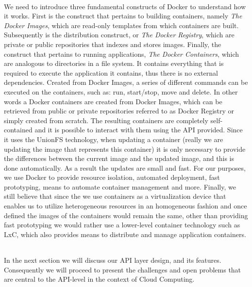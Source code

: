 \documentclass[11pt]{amsart}
\begin{document}
\begin{enumarate}
          \\ We need to introduce three fundamental constructs of Docker to understand how
          it works. First is the construct that pertains to building containers, namely
          \emph{The Docker Images}, which are read-only templates from which containers
          are built. Subsequently is the distribution construct, or \emph{The Docker
            Registry}, which are private or public repositories that indexes and stores
          images. Finally, the construct that pertains to running applications, \emph{The
            Docker Containers}, which are analogous to directories in a file system. It
          contains everything that is required to execute the application it contains,
          thus there is no external dependencies. Created from Docker Images, a series of
          different commands can be executed on the containers, such as: run, start/stop,
          move and delete. In other words a Docker containers are created from Docker
          Images, which can be retrieved from public or private repositories referred to
          as Docker Registry or simply created from scratch. The resulting containers are
          completely self-contained and it is possible to interact with them using the API
          provided. Since it uses the UnionFS technology, when updating a container
          (really we are updating the image that represents this container) it is only
          necessary to provide the differences between the current image and the updated
          image, and this is done automatically. As a result the updates are small and
          fast. For our purposes, we use Docker to provide resource isolation, automated
          deployment, fast prototyping, means to automate container management and
          more. Finally, we still believe that since the we use containers as a
          virtualization device that enables us to utilize heterogeneous resources in an
          homogeneous fashion and once defined the images of the containers would remain
          the same, other than providing fast prototyping we would rather use a
          lower-level container technology such as LxC, which also provides means to
          distribute and manage application containers.
          
          \\ In the next section we will discuss our API layer design, and its
          features. Consequently we will proceed to present the challenges and open
          problems that are central to the API-level in the context of Cloud Computing. 
         

\end{enumarate}
\end{document}
